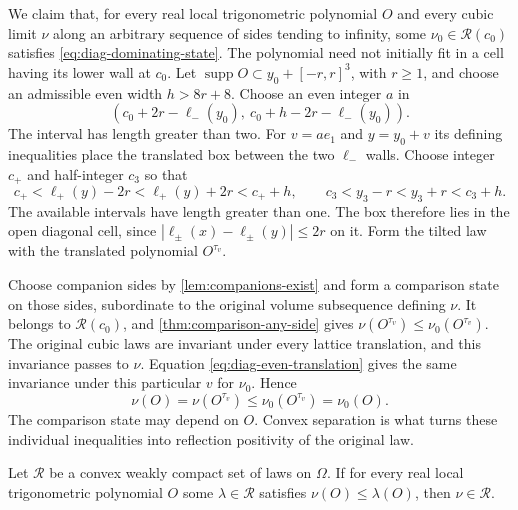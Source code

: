 \documentclass[11pt,letterpaper,reqno]{amsart}
\DeclareMathOperator{\supp}{supp}
\begin{document}
We claim that, for every real local trigonometric polynomial
$O$ and every cubic limit $\nu$ along an arbitrary sequence of sides tending to infinity, some $\nu_0\in\mathcal R(c_0)$ satisfies
\eqref{eq:diag-dominating-state}. The polynomial need not
initially fit in a cell having its lower wall at $c_0$.
Let $\supp O\subset y_0+[-r,r]^3$, with $r\ge1$, and choose
an admissible even width $h>8r+8$. Choose an even integer
$a$ in
\[
 (c_0+2r-\ell_-(y_0),\ c_0+h-2r-\ell_-(y_0)).
\]
The interval has length greater than two. For $v=ae_1$ and
$y=y_0+v$ its defining inequalities place the translated
box between the two $\ell_-$ walls. Choose integer $c_+$
and half-integer $c_3$ so that
\[
 c_+<\ell_+(y)-2r<\ell_+(y)+2r<c_++h,
 \qquad c_3<y_3-r<y_3+r<c_3+h.
\]
The available intervals have length greater than one.
The box therefore lies in the open diagonal cell, since
$|\ell_\pm(x)-\ell_\pm(y)|\le2r$ on it. Form the tilted
law with the translated polynomial $O^{\tau_v}$.

Choose companion sides by \cref{lem:companions-exist} and form a
comparison state on those sides, subordinate to the original volume
subsequence defining $\nu$. It belongs to $\mathcal R(c_0)$,
and \cref{thm:comparison-any-side} gives
$\nu(O^{\tau_v})\le\nu_0(O^{\tau_v})$. The original cubic
laws are invariant under every lattice translation, and
this invariance passes to $\nu$. Equation
\eqref{eq:diag-even-translation} gives the same invariance
under this particular $v$ for $\nu_0$. Hence
\begin{equation}\label{eq:diag-dominating-state}
 \nu(O)=\nu(O^{\tau_v})
       \le\nu_0(O^{\tau_v})=\nu_0(O).
\end{equation}
The comparison state may depend on $O$. Convex separation
is what turns these individual inequalities into reflection
positivity of the original law.

\begin{lemma}\label{lem:diag-separation}
Let $\mathcal R$ be a convex weakly compact set of laws on
$\Omega$. If for every real local trigonometric polynomial
$O$ some $\lambda\in\mathcal R$ satisfies
$\nu(O)\le\lambda(O)$, then $\nu\in\mathcal R$.
\end{lemma}
\end{document}
